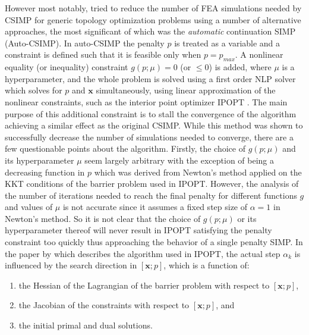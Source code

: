 However most notably, \cite{Rojas-Labanda2015} tried to reduce the number of FEA simulations needed by CSIMP for generic topology optimization problems using a number of alternative approaches, the most significant of which was the \textit{automatic} continuation SIMP (Auto-CSIMP). In auto-CSIMP the penalty $p$ is treated as a variable and a constraint is defined such that it is feasible only when $p = p_{max}$. A nonlinear equality (or inequality) constraint $g(p;\mu) = 0$ (or $\leq 0$) is added, where $\mu$ is a hyperparameter, and the whole problem is solved using a first order NLP solver which solves for $p$ and $\bm{x}$ simultaneously, using linear approximation of the nonlinear constraints, such as the interior point optimizer IPOPT \citep{Wachter2006}. The main purpose of this additional constraint is to stall the convergence of the algorithm achieving a similar effect as the original CSIMP. While this method was shown to successfully decrease the number of simulations needed to converge, there are a few questionable points about the algorithm. Firstly, the choice of $g(p;\mu)$ and its hyperparameter $\mu$ seem largely arbitrary with the exception of being a decreasing function in $p$ which was derived from Newton's method applied on the KKT conditions of the barrier problem used in IPOPT. However, the analysis of the number of iterations needed to reach the final penalty for different functions $g$ and values of $\mu$ is not accurate since it assumes a fixed step size of $\alpha = 1$ in Newton's method. So it is not clear that the choice of $g(p;\mu)$ or its hyperparameter thereof will never result in IPOPT satisfying the penalty constraint too quickly thus approaching the behavior of a single penalty SIMP. In the paper by \cite{Wachter2006} which describes the algorithm used in IPOPT, the actual step $\alpha_k$ is influenced by the search direction in $[\bm{x}; p]$, which is a function of: 
  \begin{enumerate}[label=(\arabic*)]
    \item the Hessian of the Lagrangian of the barrier problem with respect to $[\bm{x}; p]$, 
    \item the Jacobian of the constraints with respect to $[\bm{x}; p]$, and 
    \item the initial primal and dual solutions. 
  \end{enumerate}
